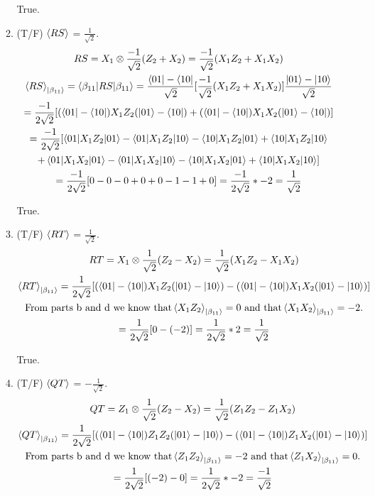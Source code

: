 \documentclass[]{article}
\begin{document}
\begin{enumerate}
\begin{enumerate}
          True.
        \item (T/F) $\braket{RS}$ = $\frac{1}{\sqrt{2}}$.
          \begin{gather*}
            RS = X_1 \otimes \frac{-1}{\sqrt{2}}(Z_2 + X_2) = \frac{-1}{\sqrt{2}}(X_1 Z_2 + X_1 X_2)\\
            \braket{RS}_{\ket{\beta_{11}}} = \braket{\beta_{11} | RS | \beta_{11}}
            = \frac{\bra{01} - \bra{10}}{\sqrt{2}}[\frac{-1}{\sqrt{2}}(X_1 Z_2 + X_1 X_2)]
            \frac{\ket{01} - \ket{10}}{\sqrt{2}}\\
            = \frac{-1}{2\sqrt{2}}[(\bra{01} - \bra{10})X_1 Z_2(\ket{01} - \bra{10}) + 
            (\bra{01} - \bra{10})X_1 X_2(\ket{01} - \bra{10})]\\
            = \frac{-1}{2\sqrt{2}}[
            \braket{01|X_1 Z_2|01} - \braket{01|X_1 Z_2|10} - \braket{10|X_1 Z_2|01} + \braket{10|X_1 Z_2|10}\\
            + \braket{01|X_1 X_2|01} - \braket{01|X_1 X_2|10} - \braket{10|X_1 X_2|01} + \braket{10|X_1 X_2|10}]\\
            = \frac{-1}{2\sqrt{2}}[0-0-0+0 + 0 - 1 -1 +0] = \frac{-1}{2\sqrt{2}}*-2 = \frac{1}{\sqrt{2}}
          \end{gather*}

          True.
        \item (T/F) $\braket{RT}$ = $\frac{1}{\sqrt{2}}$.
          \begin{gather*}
            RT = X_1 \otimes \frac{1}{\sqrt{2}}(Z_2 - X_2) = \frac{1}{\sqrt{2}}(X_1 Z_2 - X_1 X_2)\\
            \braket{RT}_{\ket{\beta_{11}}}
            = \frac{1}{2\sqrt{2}}[(\bra{01} - \bra{10})X_1 Z_2(\ket{01}-\ket{10})
            - (\bra{01} - \bra{10})X_1 X_2(\ket{01}-\ket{10})]\\
            \text{From parts b and d we know that} \braket{X_1Z_2}_{\ket{\beta_{11}}} = 0 
            \text{ and that} \braket{X_1X_2}_{\ket{\beta_{11}}} = -2 \text{.}\\
            = \frac{1}{2\sqrt{2}}[0 - (-2)] = \frac{1}{2\sqrt{2}} * 2 = \frac{1}{\sqrt{2}} 
          \end{gather*}

          True.
        \item (T/F) $\braket{QT}$ = $-\frac{1}{\sqrt{2}}$.
          \begin{gather*}
            QT = Z_1 \otimes \frac{1}{\sqrt{2}}(Z_2 - X_2) = \frac{1}{\sqrt{2}}(Z_1 Z_2 - Z_1 X_2)\\
            \braket{QT}_{\ket{\beta_{11}}}
            = \frac{1}{2\sqrt{2}}[(\bra{01} - \bra{10})Z_1 Z_2(\ket{01}-\ket{10})
            - (\bra{01} - \bra{10})Z_1 X_2(\ket{01}-\ket{10})]\\
            \text{From parts b and d we know that} \braket{Z_1Z_2}_{\ket{\beta_{11}}} = -2 
            \text{ and that} \braket{Z_1X_2}_{\ket{\beta_{11}}} = 0 \text{.}\\
            = \frac{1}{2\sqrt{2}}[(-2) - 0] = \frac{1}{2\sqrt{2}} * -2 = \frac{-1}{\sqrt{2}} 
          \end{gather*}


\end{enumerate}
\end{enumerate}
\end{document}
